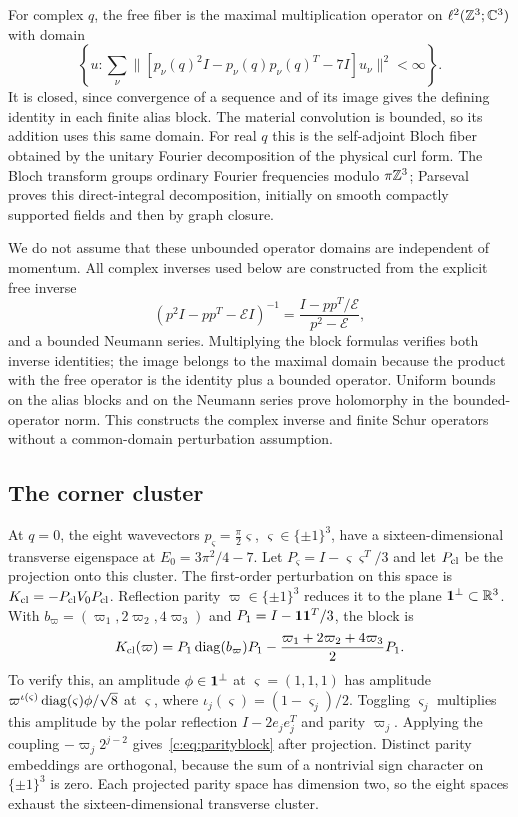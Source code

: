 For complex $q$, the free fiber is the maximal multiplication operator
on $\ell^2(\mathbb Z^3;\mathbb C^3)$ with domain
\[
 \left\{u:\sum_\nu\big\|[p_\nu(q)^2I-p_\nu(q)p_\nu(q)^T-7I]u_\nu\big\|^2
                    <\infty\right\}.
\]
It is closed, since convergence of a sequence and of its image gives
the defining identity in each finite alias block. The material
convolution is bounded, so its addition uses this same domain.
For real $q$ this is the self-adjoint Bloch fiber obtained by the
unitary Fourier decomposition of the physical curl form. The Bloch
transform groups ordinary Fourier frequencies modulo $\pi\mathbb Z^3$;
Parseval proves this direct-integral decomposition, initially on
smooth compactly supported fields and then by graph closure.

We do not assume that these unbounded operator domains are independent
of momentum. All complex inverses used below are constructed from the
explicit free inverse
\begin{equation}
 (p^2I-pp^T-\mathcal EI)^{-1}
   =\frac{I-pp^T/\mathcal E}{p^2-\mathcal E},                           \label{c:eq:freeinverse}
\end{equation}
and a bounded Neumann series. Multiplying the block formulas verifies
both inverse identities; the image belongs to the maximal domain
because the product with the free operator is the identity plus a
bounded operator. Uniform bounds on the alias blocks and on the
Neumann series prove holomorphy in the bounded-operator norm.
This constructs the complex inverse and finite Schur operators
without a common-domain perturbation assumption.

\subsection{The corner cluster}
At $q=0$, the eight wavevectors $p_\varsigma=\tfrac\pi2\varsigma$, $\varsigma\in\{\pm1\}^3$,
have a sixteen-dimensional transverse eigenspace at
$E_0=3\pi^2/4-7$. Let $P_\varsigma=I-\varsigma\varsigma^T/3$ and let $P_{\rm cl}$ be the projection onto this cluster. The first-order perturbation on
this space is $K_{\rm cl}=-P_{\rm cl}V_0P_{\rm cl}$. Reflection parity $\varpi\in\{\pm1\}^3$ reduces
it to the plane $\mathbf 1^\perp\subset\mathbb R^3$. With
$b_\varpi=(\varpi_1,2\varpi_2,4\varpi_3)$ and $P_1=I-\mathbf 1\mathbf 1^T/3$, the block is
\begin{equation}
 K_{\rm cl}(\varpi)=P_1\operatorname{diag}(b_\varpi)P_1-\frac{\varpi_1+2\varpi_2+4\varpi_3}{2}P_1.
                                                               \label{c:eq:parityblock}
\end{equation}
To verify this, an amplitude $\phi\in\mathbf 1^\perp$ at $\varsigma=(1,1,1)$ has
amplitude $\varpi^{\iota(\varsigma)}\operatorname{diag}(\varsigma)\phi/\sqrt8$ at $\varsigma$, where
$\iota_j(\varsigma)=(1-\varsigma_j)/2$. Toggling $\varsigma_j$ multiplies this amplitude by the
polar reflection $I-2e_je_j^T$ and parity $\varpi_j$. Applying the coupling
$-\varpi_j2^{j-2}$ gives~\eqref{c:eq:parityblock} after projection. Distinct parity embeddings are orthogonal, because
the sum of a nontrivial sign character on $\{\pm1\}^3$ is zero.
Each projected parity space has dimension two, so the eight spaces
exhaust the sixteen-dimensional transverse cluster.

